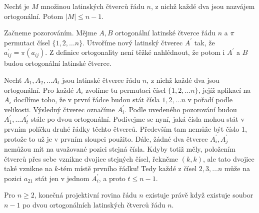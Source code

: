 \begin{t_theorem}
  Nechť je $M$ množinou latinských čtverců řádu $n$, z nichž každé dva jsou nazvájem ortogonální. Potom $|M|\leq n-1$.
\end{t_theorem}

\begin{t_proof}
  Začneme pozorováním. Mějme $A, B$ ortogonální latinské čtverce řádu $n$ a $\pi$ permutaci čísel $\{1, 2,\dots n\}$. Utvoříme nový latinský čtverec $A^\prime$ tak, že $a^\prime_{ij}=\pi(a_{ij})$. Z definice ortogonality není těžké nahlédnout, že potom i $A^\prime$ a $B$ budou ortogonální latinské čtverce.
  
  Nechť $A_1,A_2,\dots A_t$ jsou latinské čtverce řádu $n$, z nichž každé dva jsou ortogonální. Pro každé $A_i$ zvolíme tu permutaci čísel $\{1,2,\dots n\}$, jejíž aplikací na $A_i$ docílíme toho, že v první řádce budou stát čísla $1,2,\dots n$ v pořadí podle velikosti. Výsledný čtverec označíme $A^\prime_i$. Podle uvedeného pozorování budou $A^\prime_1,\dots A^\prime_t$ stále po dvou ortogonální. Podívejme se nyní, jaká čísla mohou stát v prvním políčku druhé řádky těchto čtverců. Především tam nemůže být číslo 1, protože to už je v prvním sloupci použito. Dále, žádné dva čtverce $A^\prime_i, A^\prime_j$ nemůžou mít na uvažované pozici stejná čísla. Kdyby totiž měly, položením čtverců přes sebe vznikne dvojice stejných čísel, řekněme $(k,k)$, ale tato dvojice také vznikne na $k$-tém místě prvního řádku! Tedy každé z čísel $2,3,\dots n$ může na pozici $a_{21}$ stát jen v jednom $A^\prime_i$, a proto $t\leq n-1$.
\end{t_proof}

\begin{t_theorem}
  Pro $n\geq 2$, konečná projektivní rovina řádu $n$ existuje právě když existuje soubor $n-1$ po dvou ortogonálních latinských čtverců řádu $n$.
\end{t_theorem}

